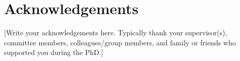 \chapter*{Acknowledgements}
[Write your acknowledgements here. Typically thank your supervisor(s),
committee members, colleagues/group members, and family or friends who
supported you during the PhD.]
